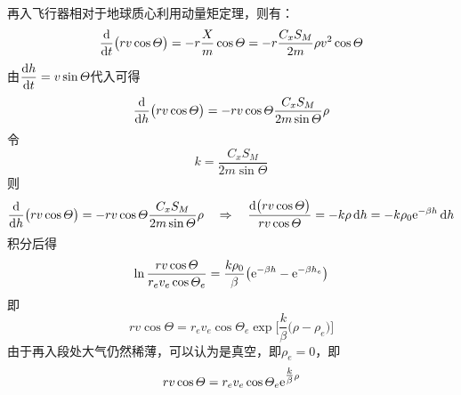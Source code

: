 再入飞行器相对于地球质心利用动量矩定理，则有：
\begin{equation}
	\dfrac{{\rm{d}} }{{\rm{d}} t}\big(r v \cos \varTheta\big) = - r \dfrac{X}{m}\cos \varTheta = - r\dfrac{C_x S_M}{2m}\rho v^2 \cos \varTheta
\end{equation}
由$\dfrac{{\rm{d}} h}{{\rm{d}} t} = v \sin \varTheta$代入可得
\begin{equation}
	\dfrac{{\rm{d}}}{{\rm{d}} h}\big(rv \cos \varTheta\big) = - rv\cos \varTheta\dfrac{C_x S_M}{2 m \sin \varTheta}\rho
\end{equation}
令
\begin{equation}
	k = \dfrac{C_x S_M}{2 m \sin \varTheta}
\end{equation}
则
\begin{equation}
	\dfrac{{\rm{d}}}{{\rm{d}} h}\big(rv \cos \varTheta\big) = - rv\cos \varTheta\dfrac{C_x S_M}{2 m \sin \varTheta}\rho \quad \Rightarrow \quad \dfrac{{\rm{d}} \big(rv \cos \varTheta\big)}{r v \cos \varTheta} = - k \rho \, {\rm{d}} h = - k \rho_0 {\rm{e}}^{- \beta h}\, {\rm{d}} h
\end{equation}
积分后得
\begin{equation}
	\ln \dfrac{rv \cos \varTheta}{r_e v_e \cos \varTheta_e} = \dfrac{k \rho_0}{\beta}\big({\rm{e}}^{-\beta h} - {\rm{e}}^{- \beta h_e}\big)
\end{equation}
即
\begin{equation}
	rv \cos \varTheta = r_e v_e \cos \varTheta_e \exp \bigg[\dfrac{k}{\beta} \big(\rho - \rho_e\big)\bigg]
\end{equation}
由于再入段处大气仍然稀薄，可以认为是真空，即$\rho_e = 0$，即
\begin{equation}
	r v \cos \varTheta = r_e v_e \cos \varTheta_e {\rm{e}}^{{\textstyle \frac{k}{\beta}} \rho}
\end{equation}


